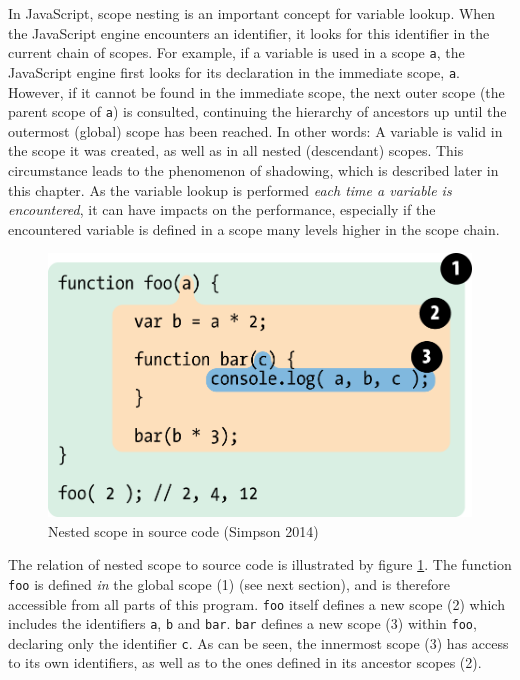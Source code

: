 In JavaScript, scope nesting is an important concept for variable
lookup. When the JavaScript engine encounters an identifier, it looks
for this identifier in the current chain of scopes. For example, if a
variable is used in a scope \texttt{a}, the JavaScript engine first
looks for its declaration in the immediate scope, \texttt{a}. However,
if it cannot be found in the immediate scope, the next outer scope (the
parent scope of \texttt{a}) is consulted, continuing the hierarchy of
ancestors up until the outermost (global) scope has been reached. In
other words: A variable is valid in the scope it was created, as well as
in all nested (descendant) scopes. This circumstance leads to the
phenomenon of shadowing, which is described later in this chapter. As
the variable lookup is performed \emph{each time a variable is
encountered}, it can have impacts on the performance, especially if the
encountered variable is defined in a scope many levels higher in the
scope chain.

\begin{figure}[htbp]
\centering
\includegraphics[keepaspectratio]{img/fig2.png}
\caption{Nested scope in source code (Simpson 2014)}
\label{fig:getify}
\end{figure}

The relation of nested scope to source code is illustrated by figure
\ref{fig:getify}. The \gls{function} \texttt{foo} is defined \emph{in}
the global scope (1) (see next section), and is therefore accessible
from all parts of this program. \texttt{foo} itself defines a new scope
(2) which includes the identifiers \texttt{a}, \texttt{b} and
\texttt{bar}. \texttt{bar} defines a new scope (3) within \texttt{foo},
declaring only the identifier \texttt{c}. As can be seen, the innermost
scope (3) has access to its own identifiers, as well as to the ones
defined in its ancestor scopes (2).

